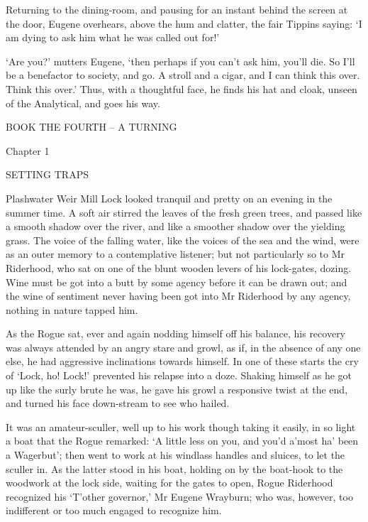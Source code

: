 Returning to the dining-room, and pausing for an instant behind the
screen at the door, Eugene overhears, above the hum and clatter, the
fair Tippins saying: ‘I am dying to ask him what he was called out for!’

‘Are you?’ mutters Eugene, ‘then perhaps if you can’t ask him, you’ll
die. So I’ll be a benefactor to society, and go. A stroll and a cigar,
and I can think this over. Think this over.’ Thus, with a thoughtful
face, he finds his hat and cloak, unseen of the Analytical, and goes his
way.





BOOK THE FOURTH -- A TURNING



Chapter 1

SETTING TRAPS


Plashwater Weir Mill Lock looked tranquil and pretty on an evening in
the summer time. A soft air stirred the leaves of the fresh green trees,
and passed like a smooth shadow over the river, and like a smoother
shadow over the yielding grass. The voice of the falling water, like
the voices of the sea and the wind, were as an outer memory to a
contemplative listener; but not particularly so to Mr Riderhood, who sat
on one of the blunt wooden levers of his lock-gates, dozing. Wine must
be got into a butt by some agency before it can be drawn out; and the
wine of sentiment never having been got into Mr Riderhood by any agency,
nothing in nature tapped him.

As the Rogue sat, ever and again nodding himself off his balance, his
recovery was always attended by an angry stare and growl, as if, in the
absence of any one else, he had aggressive inclinations towards himself.
In one of these starts the cry of ‘Lock, ho! Lock!’ prevented his
relapse into a doze. Shaking himself as he got up like the surly brute
he was, he gave his growl a responsive twist at the end, and turned his
face down-stream to see who hailed.

It was an amateur-sculler, well up to his work though taking it easily,
in so light a boat that the Rogue remarked: ‘A little less on you, and
you’d a’most ha’ been a Wagerbut’; then went to work at his windlass
handles and sluices, to let the sculler in. As the latter stood in his
boat, holding on by the boat-hook to the woodwork at the lock side,
waiting for the gates to open, Rogue Riderhood recognized his ‘T’other
governor,’ Mr Eugene Wrayburn; who was, however, too indifferent or too
much engaged to recognize him.


